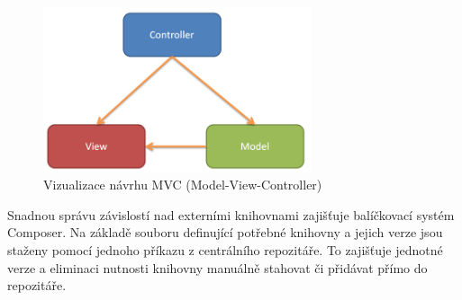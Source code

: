 \documentclass[thesis=B,czech]{FITthesis}[2012/06/26]
\begin{document}
\begin{figure}[h]\centering
 	\includegraphics[width=0.7\textwidth]{resources/mvc}
	\caption[MVC]{Vizualizace návrhu MVC (Model-View-Controller)}\label{fig:mvc}
\end{figure}
\par
Snadnou správu závislostí nad externími knihovnami zajišťuje balíčkovací systém Composer\cite{composer}. 
Na základě souboru definující potřebné knihovny a jejich verze jsou staženy pomocí jednoho příkazu z centrálního repozitáře. To zajišťuje jednotné verze
a eliminaci nutnosti knihovny manuálně stahovat či přidávat přímo do repozitáře.
\end{document}
